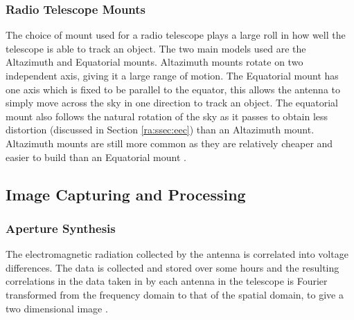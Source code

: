 \subsubsection{Radio Telescope Mounts}\label{ra:ssec:mount}
The choice of mount used for a radio telescope plays a large roll in how well the telescope is able to track an object. The two main models used are the Altazimuth and Equatorial mounts. Altazimuth mounts rotate on two independent axis, giving it a large range of motion. The Equatorial mount has one axis which is fixed to be parallel to the equator, this allows the antenna to simply move across the sky in one direction to track an object. The equatorial mount also follows the natural rotation of the sky as it passes to obtain less distortion (discussed in Section \ref{ra:ssec:eec}) than an Altazimuth mount. Altazimuth mounts are still more common as they are relatively cheaper and easier to build than an Equatorial mount \citep{thompson2008interferometry}.
%
\subsection{Image Capturing and Processing}\label{ra:sec:ic}
%
\subsubsection{Aperture Synthesis}\label{ra:ssec:rii}
The electromagnetic radiation collected by the antenna is correlated into voltage differences. The data is collected and stored over some hours and the resulting correlations in the data taken in by each antenna in the telescope is Fourier transformed from the frequency domain to that of the spatial domain, to give a two dimensional image \citep{sault1994multi}.
%
